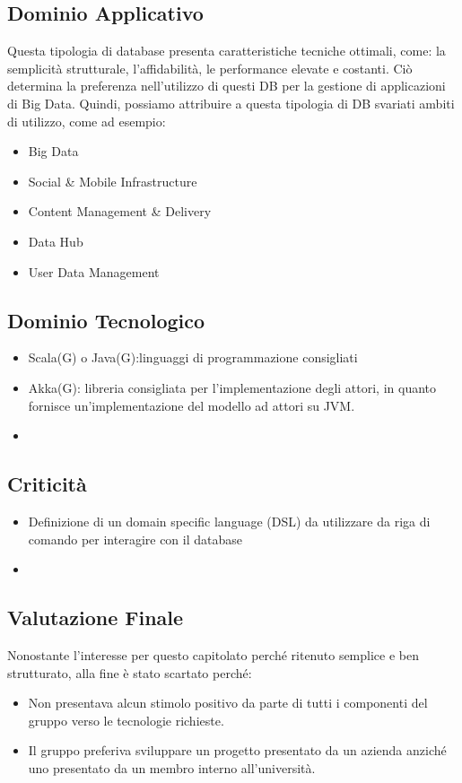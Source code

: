 \subsection{Dominio Applicativo}
Questa tipologia di database presenta caratteristiche tecniche ottimali, come: la semplicità strutturale, l'affidabilità, le performance elevate e costanti.
Ciò determina la preferenza nell'utilizzo di questi DB per la gestione di applicazioni di Big Data.
Quindi, possiamo attribuire a questa tipologia di DB svariati ambiti di utilizzo, come ad esempio:
\begin{itemize}
\item
Big Data 
\item
Social & Mobile Infrastructure
\item
Content Management & Delivery
\item
Data Hub
\item
User Data Management 
\end{itemize}

\subsection{Dominio Tecnologico}
\begin{itemize}
\item
Scala(G) o Java(G):linguaggi di programmazione consigliati
\item
Akka(G): libreria consigliata per l'implementazione degli attori, in quanto fornisce un'implementazione del modello ad attori su JVM.
\item
\end{itemize}

\subsection{Criticità}
\begin{itemize}
\item
Definizione di un domain specific language (DSL) da utilizzare da riga di comando per interagire con il database
\item
\end{itemize}

\subsection{Valutazione Finale}
Nonostante l'interesse per questo capitolato perché ritenuto semplice e ben strutturato, alla fine è stato scartato perché:
\begin{itemize}
\item
Non presentava alcun stimolo positivo da parte di tutti i componenti del gruppo verso le tecnologie richieste.
\item
Il gruppo preferiva sviluppare un progetto presentato da un azienda anziché uno presentato da un membro interno all'università.
\end{itemize}